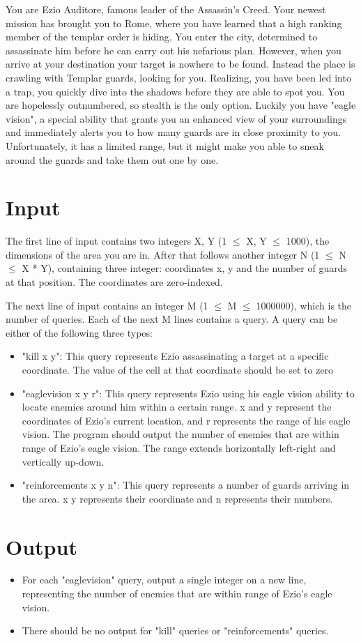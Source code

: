 

You are Ezio Auditore, famous leader of the Assassin's Creed. Your newest mission has brought you to Rome, where you have learned that a high ranking member of the templar order is hiding. You enter the city, determined to assassinate him before he can carry out his nefarious plan.
However, when you arrive at your destination your target is nowhere to be found. Instead the place is crawling with Templar guards, looking for you. Realizing, you have been led into a trap, you quickly dive into the shadows before they are able to spot you.
You are hopelessly outnumbered, so stealth is the only option. Luckily you have "eagle vision", a special ability that grants you an enhanced view of your surroundings and immediately alerts you to how many guards are in close proximity to you. Unfortunately, it has a limited range, but it might make you able to sneak around the guards and take them out one by one.

\section*{Input}

The first line of input contains two integers X, Y (1 $\le$ X, Y $\le$ 1000), the dimensions of the area you are in. After that follows another integer N (1 $\le$ N $\le$ X * Y), containing three integer: coordinates x, y and the number of guards at that position. The coordinates are zero-indexed.

The next line of input contains an integer M (1 $\le$ M $\le$ 1000000), which is the number of queries. Each of the next M lines contains a query. A query can be either of the following three types:

\begin{itemize}
    \item "kill x y": This query represents Ezio assassinating a target at a specific coordinate. The value of the cell at that coordinate should be set to zero
    \item "eaglevision x y r": This query represents Ezio using his eagle vision ability to locate enemies around him within a certain range. x and y represent the coordinates of Ezio's current location, and r represents the range of his eagle vision. The program should output the number of enemies that are within range of Ezio's eagle vision. The range extends horizontally left-right and vertically up-down.
    \item "reinforcements x y n": This query represents a number of guards arriving in the area. x y represents their coordinate and n represents their numbers.
\end{itemize}

\section*{Output}

\begin{itemize}
    \item For each "eaglevision" query, output a single integer on a new line, representing the number of enemies that are within range of Ezio's eagle vision.
    \item There should be no output for "kill" queries or "reinforcements" queries. 
\end{itemize}